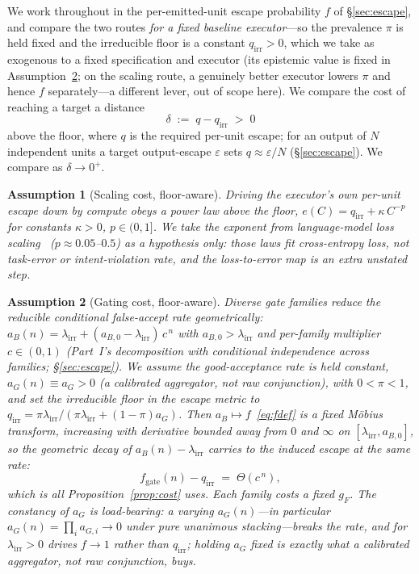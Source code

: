 \documentclass[11pt]{article}
\newtheorem{assumption}{Assumption}
\theoremstyle{definition}
\theoremstyle{remark}
\newcommand{\lirr}{\lambda_{\mathrm{irr}}}
\newcommand{\fesc}{f}
\begin{document}
We work throughout in the per-emitted-unit escape probability $\fesc$ of \S\ref{sec:escape}, and compare
the two routes \emph{for a fixed baseline executor}---so the prevalence $\pi$ is held fixed and the
irreducible floor is a constant $q_{\mathrm{irr}}>0$, which we take as exogenous to a fixed specification
and executor (its epistemic value is fixed in Assumption~\ref{ass:gate}; on the scaling route, a
genuinely better executor lowers $\pi$ and hence $\fesc$ separately---a different lever, out of scope
here). We compare the cost of
reaching a target a distance
\[
\delta\;:=\;q-q_{\mathrm{irr}}\;>\;0
\]
above the floor, where $q$ is the required per-unit escape; for an output of $N$ independent units a
target output-escape $\varepsilon$ sets $q\approx\varepsilon/N$ (\S\ref{sec:escape}). We compare as
$\delta\to0^+$.

\begin{assumption}[Scaling cost, floor-aware]\label{ass:det}
Driving the executor's own per-unit escape down by compute obeys a power law above the floor,
$e(C)=q_{\mathrm{irr}}+\kappa\,C^{-p}$ for constants $\kappa>0$, $p\in(0,1]$. We take the exponent from
language-model \emph{loss} scaling~\cite{kaplan2020,hoffmann2022} ($p\approx0.05$--$0.5$) as a
\emph{hypothesis only}: those laws fit cross-entropy loss, not task-error or intent-violation rate, and
the loss-to-error map is an extra unstated step.
\end{assumption}

\begin{assumption}[Gating cost, floor-aware]\label{ass:gate}
Diverse gate families reduce the \emph{reducible} conditional false-accept rate geometrically:
$a_B(n)=\lirr+(a_{B,0}-\lirr)\,c^{\,n}$ with $a_{B,0}>\lirr$ and per-family multiplier $c\in(0,1)$
(Part~I's decomposition with conditional independence across families; \S\ref{sec:escape}). We assume the good-acceptance rate is
held \emph{constant}, $a_G(n)\equiv a_G>0$ (a calibrated aggregator, not raw conjunction), with
$0<\pi<1$, and set the irreducible floor in the escape metric to
$q_{\mathrm{irr}}=\pi\lirr/(\pi\lirr+(1-\pi)a_G)$. Then $a_B\mapsto\fesc$~\eqref{eq:fdef} is a
\emph{fixed} M\"obius transform, increasing with derivative bounded away from $0$ and $\infty$ on
$[\lirr,a_{B,0}]$, so the geometric decay of $a_B(n)-\lirr$ carries to the induced escape at the same
rate:
\begin{equation}\label{eq:gaterate}
f_{\mathrm{gate}}(n)-q_{\mathrm{irr}}\;=\;\Theta(c^{\,n}),
\end{equation}
which is all Proposition~\ref{prop:cost} uses. Each family costs a fixed $g_F$. The constancy of $a_G$
is load-bearing: a varying $a_G(n)$---in particular $a_G(n)=\prod_i a_{G,i}\to0$ under pure unanimous
stacking---breaks the rate, and for $\lirr>0$ drives $\fesc\to1$ rather than $q_{\mathrm{irr}}$; holding
$a_G$ fixed is exactly what a calibrated aggregator, not raw conjunction, buys.
\end{assumption}
\end{document}
